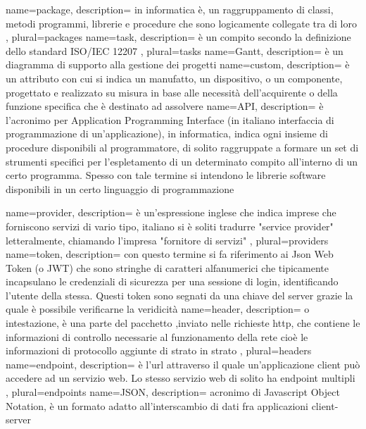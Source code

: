 \makeglossary
 {
	name=package,
	description={ in informatica è, un raggruppamento di classi, metodi programmi, librerie e procedure che sono logicamente collegate tra di loro
	},
	plural=packages
}
 {
	name=task,
	description={ è un compito secondo la definizione dello standard ISO/IEC 12207
	},
	plural=tasks
}
 {
	name=Gantt,
	description={  è un diagramma di supporto alla gestione dei progetti
	}
}
 {
	name=custom,
	description={ è un attributo con cui si indica un manufatto, un dispositivo, o un componente, progettato e realizzato su misura in base alle necessità dell'acquirente o della funzione specifica che è destinato ad assolvere
	}
}
 {
	name={API},
	description={ è l'acronimo per Application Programming Interface (in italiano interfaccia di programmazione di un'applicazione), in informatica, indica ogni insieme di procedure disponibili al programmatore, di solito raggruppate a formare un set di strumenti specifici per l'espletamento di un determinato compito all'interno di un certo programma. Spesso con tale termine si intendono le librerie software disponibili in un certo linguaggio di programmazione
	}
}

 {
	name=provider,
	description={ è un'espressione inglese che indica imprese che forniscono servizi di vario tipo,  italiano si è soliti tradurre "service provider" letteralmente, chiamando l'impresa "fornitore di servizi"
	},
	plural=providers
}
 {
	name=token,
	description={ con questo termine si fa riferimento ai Json Web Token (o JWT) che sono stringhe di caratteri alfanumerici che tipicamente incapsulano le credenziali di sicurezza per una sessione di login, identificando l'utente della stessa. Questi token sono segnati da una chiave del server grazie la quale è possibile verificarne la veridicità
	}
}
 {
	name=header,
	description={ o intestazione, è una parte del pacchetto ,inviato nelle richieste http, che contiene le informazioni di controllo necessarie al funzionamento della rete cioè le informazioni di protocollo aggiunte di strato in strato
	},
	plural=headers
}
 {
	name=endpoint,
	description={ è l'url attraverso il quale un'applicazione client può accedere ad un servizio web. Lo stesso servizio web di solito ha endpoint multipli
	},
	plural=endpoints
}
 {
	name={JSON},
	description={  acronimo di Javascript Object Notation, è un formato adatto all'interscambio di dati fra applicazioni client-server
	}
}

